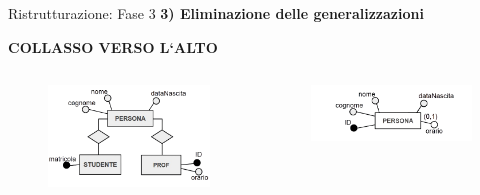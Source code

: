 %
\begin{frame}{Ristrutturazione: Fase 3}
\textbf{3) Eliminazione delle generalizzazioni}
\\\vspace{2em}
\begin{center}
    \textbf{COLLASSO VERSO L`ALTO}
\end{center}
\begin{columns}
        \begin{column}{0.5\textwidth}
            \begin{figure}[h]
        \centering
        \includegraphics[width=1\textwidth]{img/i6.png}
    \end{figure}
        \end{column}
        \begin{column}{0.5\textwidth}
            \begin{figure}[h]
        \centering
        \includegraphics[width=1\textwidth]{img/i8.png}
    \end{figure}
        \end{column}
    \end{columns}
\end{frame}
%
